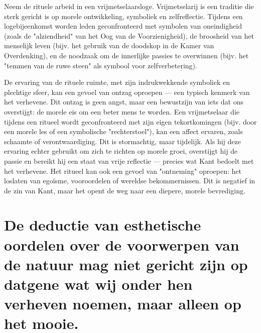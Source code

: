 \begin{mdframed}[leftmargin=0pt,rightmargin=0pt,backgroundcolor=blue!6,linecolor=white,innertopmargin=6pt,innerbottommargin=6pt]
Neem de rituele arbeid in een vrijmetselaarsloge. Vrijmetselarij is een traditie die sterk gericht is op morele ontwikkeling, symboliek en zelfreflectie. Tijdens een logebijeenkomst worden leden geconfronteerd met symbolen van oneindigheid (zoals de "alziendheid" van het Oog van de Voorzienigheid), de broosheid van het menselijk leven (bijv. het gebruik van de doodskop in de Kamer van Overdenking), en de noodzaak om de innerlijke passies te overwinnen (bijv. het "temmen van de ruwe steen" als symbool voor zelfverbetering).

De ervaring van de rituele ruimte, met zijn indrukwekkende symboliek en plechtige sfeer, kan een gevoel van ontzag oproepen — een typisch kenmerk van het verhevene. Dit ontzag is geen angst, maar een bewustzijn van iets dat ons overstijgt: de morele eis om een beter mens te worden.
Een vrijmetselaar die tijdens een ritueel wordt geconfronteerd met zijn eigen tekortkomingen (bijv. door een morele les of een symbolische "rechterstoel"), kan een affect ervaren, zoals schaamte of verontwaardiging. Dit is stormachtig, maar tijdelijk. Als hij deze ervaring echter gebruikt om zich te richten op morele groei, overstijgt hij de passie en bereikt hij een staat van vrije reflectie — precies wat Kant bedoelt met het verhevene.
Het ritueel kan ook een gevoel van "ontneming" oproepen: het loslaten van egoïsme, vooroordelen of wereldse bekommernissen. Dit is negatief in de zin van Kant, maar het opent de weg naar een diepere, morele bevrediging.

\end{mdframed}


\section{De deductie van esthetische oordelen over de voorwerpen van de natuur mag niet gericht zijn op datgene wat wij onder hen verheven noemen, maar alleen op het mooie.}


